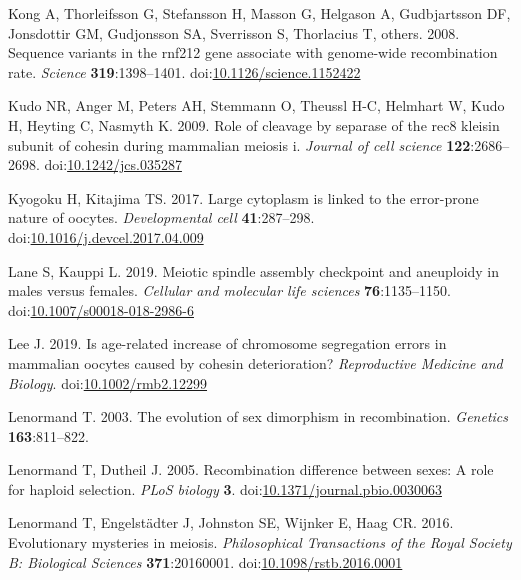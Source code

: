 \documentclass[
]{article}
\begin{document}
\leavevmode\hypertarget{ref-Kong2008}{}%
Kong A, Thorleifsson G, Stefansson H, Masson G, Helgason A, Gudbjartsson
DF, Jonsdottir GM, Gudjonsson SA, Sverrisson S, Thorlacius T, others.
2008. Sequence variants in the rnf212 gene associate with genome-wide
recombination rate. \emph{Science} \textbf{319}:1398--1401.
doi:\href{https://doi.org/10.1126/science.1152422}{10.1126/science.1152422}

\leavevmode\hypertarget{ref-kudo2009}{}%
Kudo NR, Anger M, Peters AH, Stemmann O, Theussl H-C, Helmhart W, Kudo
H, Heyting C, Nasmyth K. 2009. Role of cleavage by separase of the rec8
kleisin subunit of cohesin during mammalian meiosis i. \emph{Journal of
cell science} \textbf{122}:2686--2698.
doi:\href{https://doi.org/10.1242/jcs.035287}{10.1242/jcs.035287}

\leavevmode\hypertarget{ref-kyogoku2017}{}%
Kyogoku H, Kitajima TS. 2017. Large cytoplasm is linked to the
error-prone nature of oocytes. \emph{Developmental cell}
\textbf{41}:287--298.
doi:\href{https://doi.org/10.1016/j.devcel.2017.04.009}{10.1016/j.devcel.2017.04.009}

\leavevmode\hypertarget{ref-LaneKauppi2019}{}%
Lane S, Kauppi L. 2019. Meiotic spindle assembly checkpoint and
aneuploidy in males versus females. \emph{Cellular and molecular life
sciences} \textbf{76}:1135--1150.
doi:\href{https://doi.org/10.1007/s00018-018-2986-6}{10.1007/s00018-018-2986-6}

\leavevmode\hypertarget{ref-Lee2019}{}%
Lee J. 2019. Is age-related increase of chromosome segregation errors in
mammalian oocytes caused by cohesin deterioration? \emph{Reproductive
Medicine and Biology}.
doi:\href{https://doi.org/10.1002/rmb2.12299}{10.1002/rmb2.12299}

\leavevmode\hypertarget{ref-lenormand2003}{}%
Lenormand T. 2003. The evolution of sex dimorphism in recombination.
\emph{Genetics} \textbf{163}:811--822.

\leavevmode\hypertarget{ref-lenormandDuthiel_2005}{}%
Lenormand T, Dutheil J. 2005. Recombination difference between sexes: A
role for haploid selection. \emph{PLoS biology} \textbf{3}.
doi:\href{https://doi.org/10.1371/journal.pbio.0030063}{10.1371/journal.pbio.0030063}

\leavevmode\hypertarget{ref-lenormand2016}{}%
Lenormand T, Engelstädter J, Johnston SE, Wijnker E, Haag CR. 2016.
Evolutionary mysteries in meiosis. \emph{Philosophical Transactions of
the Royal Society B: Biological Sciences} \textbf{371}:20160001.
doi:\href{https://doi.org/10.1098/rstb.2016.0001}{10.1098/rstb.2016.0001}
\end{document}
